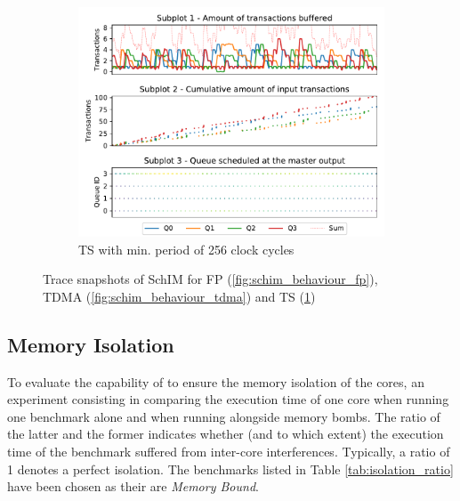 \begin{figure}[]
\begin{subfigure}{0.5\textwidth}
      \end{subfigure}
      \vfill
      \begin{subfigure}{0.5\textwidth}
        \centering
        \includegraphics[scale=0.55]{images/SchIM_MG_buffering.pdf}
        \caption{TS with min. period of 256 clock cycles}
        \label{fig:schim_behaviour_mg}
      \end{subfigure}
      \caption{Trace snapshots of SchIM for FP (\ref{fig:schim_behaviour_fp}), TDMA (\ref{fig:schim_behaviour_tdma}) and TS (\ref{fig:schim_behaviour_mg})}
      \label{fig:schim_behaviour}
    \end{figure}

  \subsection{Memory Isolation}
    To evaluate the capability of \schim to ensure the memory isolation of the cores, an experiment consisting in comparing the execution time of one core when running one benchmark alone and when running alongside memory bombs. The ratio of the latter and the former indicates whether (and to which extent) the execution time of the benchmark suffered from inter-core interferences. Typically, a ratio of 1 denotes a perfect isolation. The benchmarks listed in Table \ref{tab:isolation_ratio} have been chosen as their are \emph{Memory Bound}.
    
